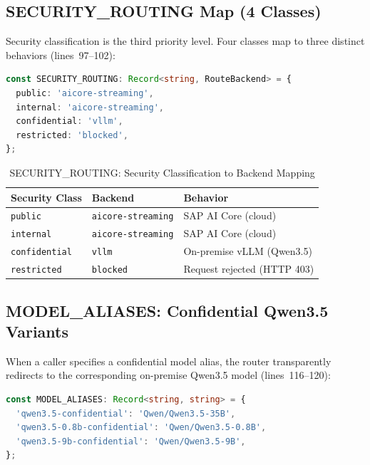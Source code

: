 \documentclass[11pt]{article}
\begin{document}
\subsection{SECURITY\_ROUTING Map (4 Classes)}

Security classification is the third priority level. Four classes map to three
distinct behaviors (lines~97--102):

\begin{lstlisting}[language=TypeScript,caption={SECURITY\_ROUTING map (intent-router.ts, lines 97--102)},firstnumber=97]
const SECURITY_ROUTING: Record<string, RouteBackend> = {
  public: 'aicore-streaming',
  internal: 'aicore-streaming',
  confidential: 'vllm',
  restricted: 'blocked',
};
\end{lstlisting}

\begin{table}[h]
\centering
\caption{SECURITY\_ROUTING: Security Classification to Backend Mapping}
\begin{tabular}{@{}lll@{}}
\toprule
\textbf{Security Class} & \textbf{Backend} & \textbf{Behavior} \\
\midrule
\texttt{public} & \texttt{aicore-streaming} & SAP AI Core (cloud) \\
\texttt{internal} & \texttt{aicore-streaming} & SAP AI Core (cloud) \\
\texttt{confidential} & \texttt{vllm} & On-premise vLLM (Qwen3.5) \\
\texttt{restricted} & \texttt{blocked} & Request rejected (HTTP 403) \\
\bottomrule
\end{tabular}
\end{table}

\subsection{MODEL\_ALIASES: Confidential Qwen3.5 Variants}

When a caller specifies a confidential model alias, the router transparently
redirects to the corresponding on-premise Qwen3.5 model (lines~116--120):

\begin{lstlisting}[language=TypeScript,caption={MODEL\_ALIASES (intent-router.ts, lines 116--120)},firstnumber=116]
const MODEL_ALIASES: Record<string, string> = {
  'qwen3.5-confidential': 'Qwen/Qwen3.5-35B',
  'qwen3.5-0.8b-confidential': 'Qwen/Qwen3.5-0.8B',
  'qwen3.5-9b-confidential': 'Qwen/Qwen3.5-9B',
};
\end{lstlisting}
\end{document}
